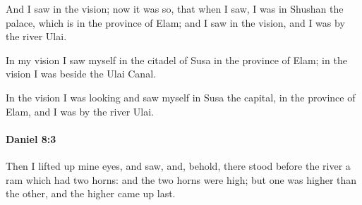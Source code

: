 			\begin{versebox}
					\item[BHS] 
					\item[LXX] 
					\item[ASV] And I saw in the vision; now it was so, that when I saw, I was in Shushan the palace, which is in the province of Elam; and I saw in the vision, and I was by the river Ulai.
					\item[NIV] In my vision I saw myself in the citadel of Susa in the province of Elam; in the vision I was beside the Ulai Canal.
					\item[NRSV] In the vision I was looking and saw myself in Susa the capital, in the province of Elam, and I was by the river Ulai.
			\end{versebox}

		\paragraph{Daniel 8:3} %
			\label{DANIEL-8-3}

			Then I lifted up mine eyes, and saw, and, behold, there stood before the river a ram which had two horns: and the two horns were high; but one was higher than the other, and the higher came up last.

